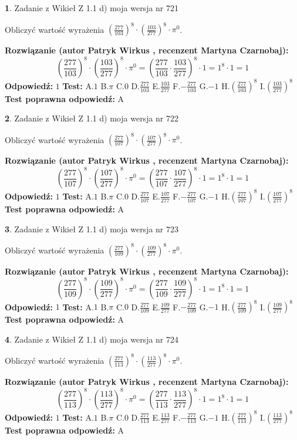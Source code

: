 \documentclass[12pt, a4paper]{article}
\theoremstyle{definition} %
\newtheorem{zad}{}
\newcommand{\zadStart}[1]{\begin{zad}#1\newline}
\newcommand{\zadStop}{\end{zad}}
\newcommand{\rozwStart}[2]{\noindent \textbf{Rozwiązanie (autor #1 , recenzent #2): }\newline}
\newcommand{\rozwStop}{\newline}
\newcommand{\odpStart}{\noindent \textbf{Odpowiedź:}\newline}
\newcommand{\odpStop}{\newline}
\newcommand{\testStart}{\noindent \textbf{Test:}\newline}
\newcommand{\testStop}{\newline}
\newcommand{\kluczStart}{\noindent \textbf{Test poprawna odpowiedź:}\newline}
\newcommand{\kluczStop}{\newline}
\begin{document}
\zadStart{Zadanie z Wikieł Z 1.1 d) moja wersja nr 721}

Obliczyć wartość wyrażenia $(\frac{277}{103})^{8} \cdot (\frac{103}{277})^{8} \cdot \pi^{0}$.
\zadStop
\rozwStart{Patryk Wirkus}{Martyna Czarnobaj}
$$(\frac{277}{103})^{8} \cdot (\frac{103}{277})^{8} \cdot \pi^{0} = (\frac{277}{103} \cdot \frac{103}{277})^{8} \cdot 1 = 1^{8} \cdot 1 = 1$$
\rozwStop
\odpStart
$1$
\odpStop
\testStart
A.$1$ B.$\pi$ C.$0$ D.$\frac{277}{103}$ E.$\frac{103}{277}$
F.$-\frac{277}{103}$ G.$-1$
H.$(\frac{277}{103})^{8}$
I.$(\frac{103}{277})^{8}$
\testStop
\kluczStart
A
\kluczStop



\zadStart{Zadanie z Wikieł Z 1.1 d) moja wersja nr 722}

Obliczyć wartość wyrażenia $(\frac{277}{107})^{8} \cdot (\frac{107}{277})^{8} \cdot \pi^{0}$.
\zadStop
\rozwStart{Patryk Wirkus}{Martyna Czarnobaj}
$$(\frac{277}{107})^{8} \cdot (\frac{107}{277})^{8} \cdot \pi^{0} = (\frac{277}{107} \cdot \frac{107}{277})^{8} \cdot 1 = 1^{8} \cdot 1 = 1$$
\rozwStop
\odpStart
$1$
\odpStop
\testStart
A.$1$ B.$\pi$ C.$0$ D.$\frac{277}{107}$ E.$\frac{107}{277}$
F.$-\frac{277}{107}$ G.$-1$
H.$(\frac{277}{107})^{8}$
I.$(\frac{107}{277})^{8}$
\testStop
\kluczStart
A
\kluczStop



\zadStart{Zadanie z Wikieł Z 1.1 d) moja wersja nr 723}

Obliczyć wartość wyrażenia $(\frac{277}{109})^{8} \cdot (\frac{109}{277})^{8} \cdot \pi^{0}$.
\zadStop
\rozwStart{Patryk Wirkus}{Martyna Czarnobaj}
$$(\frac{277}{109})^{8} \cdot (\frac{109}{277})^{8} \cdot \pi^{0} = (\frac{277}{109} \cdot \frac{109}{277})^{8} \cdot 1 = 1^{8} \cdot 1 = 1$$
\rozwStop
\odpStart
$1$
\odpStop
\testStart
A.$1$ B.$\pi$ C.$0$ D.$\frac{277}{109}$ E.$\frac{109}{277}$
F.$-\frac{277}{109}$ G.$-1$
H.$(\frac{277}{109})^{8}$
I.$(\frac{109}{277})^{8}$
\testStop
\kluczStart
A
\kluczStop



\zadStart{Zadanie z Wikieł Z 1.1 d) moja wersja nr 724}

Obliczyć wartość wyrażenia $(\frac{277}{113})^{8} \cdot (\frac{113}{277})^{8} \cdot \pi^{0}$.
\zadStop
\rozwStart{Patryk Wirkus}{Martyna Czarnobaj}
$$(\frac{277}{113})^{8} \cdot (\frac{113}{277})^{8} \cdot \pi^{0} = (\frac{277}{113} \cdot \frac{113}{277})^{8} \cdot 1 = 1^{8} \cdot 1 = 1$$
\rozwStop
\odpStart
$1$
\odpStop
\testStart
A.$1$ B.$\pi$ C.$0$ D.$\frac{277}{113}$ E.$\frac{113}{277}$
F.$-\frac{277}{113}$ G.$-1$
H.$(\frac{277}{113})^{8}$
I.$(\frac{113}{277})^{8}$
\testStop
\kluczStart
A
\kluczStop
\end{document}
